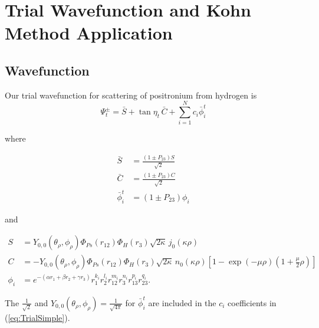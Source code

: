 \documentclass[Dissertation.tex]{subfiles}
\begin{document}
\newpage
\chapter{Trial Wavefunction and Kohn Method Application}

\section{Wavefunction}

Our trial wavefunction for scattering of positronium from hydrogen is
\begin{equation}
\Psi_t^\pm = \bar{S} + \tan \eta_t \, \bar{C} + \sum_{i=1}^N c_i \bar{\phi}_i^t
\label{eq:TrialSimple}
\end{equation}

\noindent where

\begin{subequations}\label{SCphiBarDef}
\begin{align}
\bar{S} &= \frac{\left( 1 \pm P_{23} \right) S}{\sqrt{2}} \label{SBarDef} \\
\bar{C} &= \frac{\left( 1 \pm P_{23} \right) C}{\sqrt{2}} \label{CBarDef} \\
\bar{\phi}_i^t &= \left( 1 \pm P_{23} \right) \phi_i \label{PhiBarDef}
\end{align}
\end{subequations}

\noindent and

\begin{subequations}\label{eq:SCPhiDef}
\begin{align}
S &= Y_{0,0}\left( \theta_\rho, \phi_\rho \right) \Phi_{Ps}\left(r_{12}\right) \Phi_H\left(r_3\right) \sqrt{2\kappa} \,j_0\!\left(\kappa\rho\right) \label{eq:SDef} \\
C &= -Y_{0,0}\left( \theta_\rho, \phi_\rho \right) \Phi_{Ps}\left(r_{12}\right) \Phi_H\left(r_3\right) \sqrt{2\kappa} \,n_0\!\left(\kappa\rho\right) \left[1 - \exp(-\mu \rho) (1+\frac{\mu}{2}\rho)\right] \label{eq:CDef} \\
\phi_i &= e^{-\left(\alpha r_1 + \beta r_2 + \gamma r_3 \right)} r_1^{k_i} r_2^{l_i} r_{12}^{m_i} r_3^{n_i} r_{13}^{p_i} r_{23}^{q_i}. \label{eq:PhiDef}
\end{align}
\end{subequations}

\noindent The $\frac{1}{\sqrt{2}}$ and $Y_{0,0}\left( \theta_\rho, \phi_\rho \right) = \frac{1}{\sqrt{4\pi}}$ for $\bar{\phi}_i^t$ are included in the $c_i$ coefficients in (\ref{eq:TrialSimple}).
\end{document}
